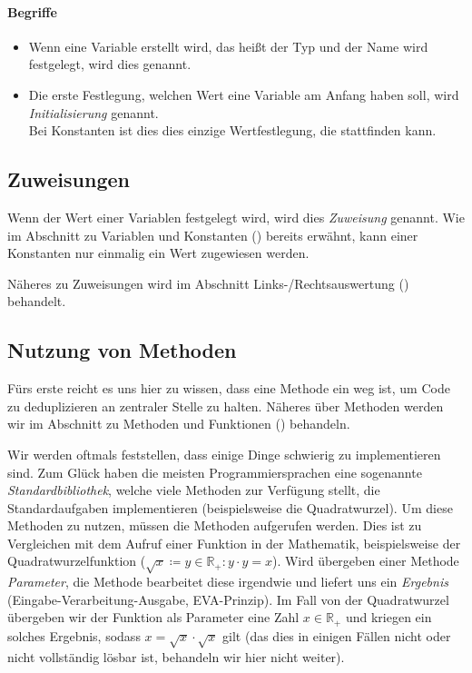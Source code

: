	\paragraph{Begriffe}
		\begin{itemize}
			\item Wenn eine Variable erstellt wird, das heißt der Typ und der Name wird festgelegt, wird dies  genannt.
			\item Die erste Festlegung, welchen Wert eine Variable am Anfang haben soll, wird \textit{Initialisierung} genannt. \\ Bei Konstanten ist dies dies einzige Wertfestlegung, die stattfinden kann.
		\end{itemize}

\subsection{Zuweisungen} \imperativeMark \oopMark
	
	Wenn der Wert einer Variablen festgelegt wird, wird dies \textit{Zuweisung} genannt. Wie im Abschnitt zu Variablen und Konstanten () bereits erwähnt, kann einer Konstanten nur einmalig ein Wert zugewiesen werden.
	
	Näheres zu Zuweisungen wird im Abschnitt Links-/Rechtsauswertung () behandelt.

\subsection{Nutzung von Methoden} \functionalMark \imperativeMark \oopMark
	
	Fürs erste reicht es uns hier zu wissen, dass eine Methode ein weg ist, um Code zu deduplizieren an zentraler Stelle zu halten. Näheres über Methoden werden wir im Abschnitt zu Methoden und Funktionen () behandeln.
	
	Wir werden oftmals feststellen, dass einige Dinge schwierig zu implementieren sind. Zum Glück haben die meisten Programmiersprachen eine sogenannte \textit{Standardbibliothek}, welche viele Methoden zur Verfügung stellt, die Standardaufgaben implementieren (beispielsweise die Quadratwurzel). Um diese Methoden zu nutzen, müssen die Methoden aufgerufen werden. Dies ist zu Vergleichen mit dem Aufruf einer Funktion in der Mathematik, beispielsweise der Quadratwurzelfunktion ($ \sqrt{x} \coloneqq y \in \mathbb{R} _ + : y \cdot y = x $). Wird übergeben einer Methode \textit{Parameter}, die Methode bearbeitet diese irgendwie und liefert uns ein \textit{Ergebnis} (Eingabe-Verarbeitung-Ausgabe, EVA-Prinzip). Im Fall von der Quadratwurzel übergeben wir der Funktion als Parameter eine Zahl $ x \in \mathbb{R} _ + $ und kriegen ein solches Ergebnis, sodass $ x = \sqrt{x} \cdot \sqrt{x} $ gilt (das dies in einigen Fällen nicht oder nicht vollständig lösbar ist, behandeln wir hier nicht weiter).

